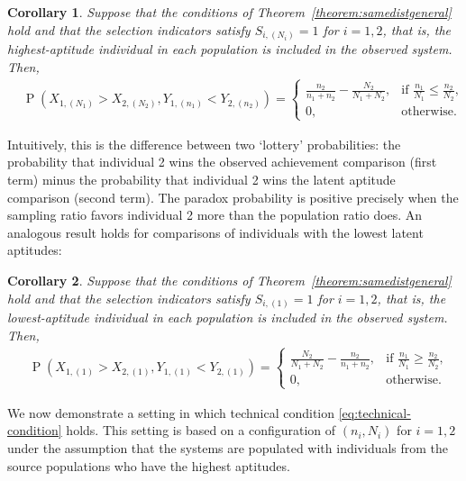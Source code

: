 \documentclass[12pt]{article}
\DeclareMathOperator*{\Prob}{P}
\newtheorem{corollary}{Corollary}[theorem]
\begin{document}
\begin{corollary} \label{corollary:samedisttop}
Suppose that the conditions of Theorem~\ref{theorem:samedistgeneral} hold and that the selection indicators satisfy $S_{i,(N_i)} = 1$ for $i=1,2$, that is, the highest-aptitude individual in each population is included in the observed system. Then,
\begin{align*}
	&\Prob\left(X_{1,(N_1)} > X_{2,(N_2)}, Y_{1,(n_1)} < Y_{2,(n_2)}\right) 
  = \begin{cases}
      \frac{n_2}{n_1 + n_2} - \frac{N_2}{N_1 + N_2}, & \text{if } \frac{n_1}{N_1} \le \frac{n_2}{N_2}, \\
      0, & \text{otherwise}.
    \end{cases}
\end{align*}
\end{corollary}

Intuitively, this is the difference between two `lottery' probabilities: the probability that individual 2 wins the observed achievement comparison (first term) minus the probability that individual 2 wins the latent aptitude comparison (second term). The paradox probability is positive precisely when the sampling ratio favors individual 2 more than the population ratio does. An analogous result holds for comparisons of individuals with the lowest latent aptitudes:

\begin{corollary} \label{corollary:samedistbottom}
Suppose that the conditions of Theorem~\ref{theorem:samedistgeneral} hold and that the selection indicators satisfy $S_{i,(1)} = 1$ for $i=1,2$, that is, the lowest-aptitude individual in each population is included in the observed system. Then,
\begin{align*}
	&\Prob\left(X_{1,(1)} > X_{2,(1)}, Y_{1,(1)} < Y_{2,(1)}\right) 
  = \begin{cases}
      \frac{N_2}{N_1 + N_2} - \frac{n_2}{n_1 + n_2}, & \text{if } \frac{n_1}{N_1} \ge \frac{n_2}{N_2}, \\
      0, & \text{otherwise}.
    \end{cases}
\end{align*}
\end{corollary}

We now demonstrate a setting in which technical condition \eqref{eq:technical-condition} holds. This setting is based on a configuration of $(n_i, N_i)$ for $i=1,2$ under the assumption that the systems are populated with individuals from the source populations who have the highest aptitudes.
\end{document}
